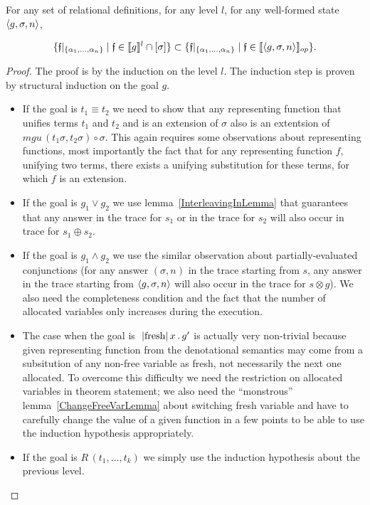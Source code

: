 \begin{lemma}
\label{GenCompletenessLemma}
For any set of relational definitions, for any level $l$, for any well-formed state $\left<{g, \sigma, n}\right>$,

\[
\{\mathfrak{f}|_{\{\alpha_1,\dots,\alpha_n\}} \mid \mathfrak{f} \in \llbracket{g}\rrbracket^l \cap [\sigma]\} \subset \{\mathfrak{f}|_{\{\alpha_1,\dots,\alpha_n\}} \mid \mathfrak{f} \in \llbracket{\left<{g, \sigma, n}\right>}\rrbracket_{op}\}.
\]
\end{lemma}
{ \color{blue}
\begin{proof}
The proof is by the induction on the level $l$. The induction step is proven by structural induction on the goal $g$.
\begin{itemize}
\item If the goal is $t_1\equiv t_2$ we need to show that any representing function that unifies terms $t_1$ and $t_2$ and is an extension of $\sigma$ also is an extentsion of $mgu\,(t_1 \sigma, t_2 \sigma) \circ \sigma$. This again requires some observations about representing functions, most importantly the fact that for any representing function $f$, unifying two terms, there exists a unifying substitution for these terms, for which $f$ is an extension.
\item If the goal is $g_1\vee g_2$ we use lemma~\ref{InterleavingInLemma} that guarantees that any answer in the trace for $s_1$ or in the trace for $s_2$ will also occur in trace for $s_1 \oplus s_2$.
\item If the goal is $g_1\wedge g_2$ we use the similar observation about partially-evaluated conjunctions (for any answer $(\sigma, n)$ in the trace starting from $s$, any answer in the trace starting from $\left<{g, \sigma, n}\right>$ will also occur in the trace for $s \otimes g$). We also need the completeness condition and the fact that the number of allocated variables only increases during the execution.
\item The case when the goal is $\mbox{\lstinline|fresh|}\,x\,.\,g'$ is actually very non-trivial because given representing function from the denotational semantics may come from a subsitution of any non-free variable as fresh, not necessarily the next one allocated. To overcome this difficulty we need the restriction on allocated variables in theorem statement; we also need the ``monstrous'' lemma~\ref{ChangeFreeVarLemma} about switching fresh variable and have to carefully change the value of a given function in a few points to be able to use the induction hypothesis appropriately.
\item If the goal is $R\,(t_1,\dots,t_k)$ we simply use the induction hypothesis about the previous level.
\end{itemize}
\end{proof}
}

